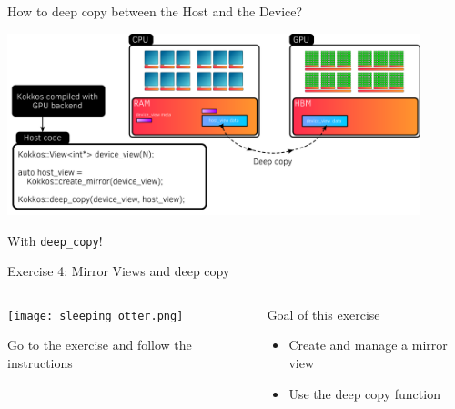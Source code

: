 \documentclass[aspectratio=169]{beamer}
\begin{document}

\begin{frame}{How to deep copy between the Host and the Device?}
    \begin{center}
        \includegraphics[width=0.9\textwidth]{host_device_deep_copy.png}
    \end{center}

     With \texttt{deep\_copy}!
\end{frame}


\begin{exerciseframe}{Exercise 4: Mirror Views and deep copy}
    \begin{columns}
        \begin{column}{0.5\linewidth}
            \begin{center}
                \texttt{[image: sleeping\_otter.png]}
            \end{center}

            Go to the exercise  and follow the instructions
        \end{column}
        \begin{column}{0.5\linewidth}
            \begin{block}{Goal of this exercise}
                \begin{itemize}
                    \item Create and manage a mirror view
                    \item Use the deep copy function
                \end{itemize}
            \end{block}
        \end{column}
    \end{columns}
\end{exerciseframe}
\end{document}
